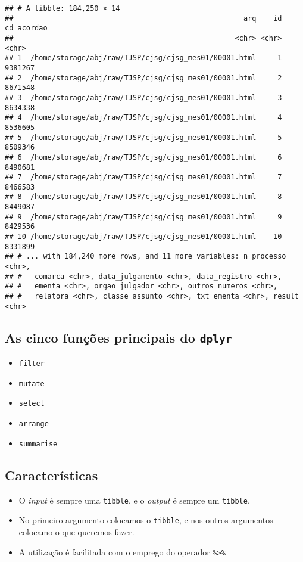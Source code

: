 \documentclass[]{book}
\providecommand{\tightlist}{%
  \setlength{\itemsep}{0pt}\setlength{\parskip}{0pt}}
\begin{document}
\begin{verbatim}
## # A tibble: 184,250 × 14
##                                                      arq    id cd_acordao
##                                                    <chr> <chr>      <chr>
## 1  /home/storage/abj/raw/TJSP/cjsg/cjsg_mes01/00001.html     1    9381267
## 2  /home/storage/abj/raw/TJSP/cjsg/cjsg_mes01/00001.html     2    8671548
## 3  /home/storage/abj/raw/TJSP/cjsg/cjsg_mes01/00001.html     3    8634338
## 4  /home/storage/abj/raw/TJSP/cjsg/cjsg_mes01/00001.html     4    8536605
## 5  /home/storage/abj/raw/TJSP/cjsg/cjsg_mes01/00001.html     5    8509346
## 6  /home/storage/abj/raw/TJSP/cjsg/cjsg_mes01/00001.html     6    8490681
## 7  /home/storage/abj/raw/TJSP/cjsg/cjsg_mes01/00001.html     7    8466583
## 8  /home/storage/abj/raw/TJSP/cjsg/cjsg_mes01/00001.html     8    8449087
## 9  /home/storage/abj/raw/TJSP/cjsg/cjsg_mes01/00001.html     9    8429536
## 10 /home/storage/abj/raw/TJSP/cjsg/cjsg_mes01/00001.html    10    8331899
## # ... with 184,240 more rows, and 11 more variables: n_processo <chr>,
## #   comarca <chr>, data_julgamento <chr>, data_registro <chr>,
## #   ementa <chr>, orgao_julgador <chr>, outros_numeros <chr>,
## #   relatora <chr>, classe_assunto <chr>, txt_ementa <chr>, result <chr>
\end{verbatim}

\subsection{\texorpdfstring{As cinco funções principais do
\texttt{dplyr}}{As cinco funções principais do dplyr}}\label{as-cinco-funcoes-principais-do-dplyr}

\begin{itemize}
\tightlist
\item
  \texttt{filter}
\item
  \texttt{mutate}
\item
  \texttt{select}
\item
  \texttt{arrange}
\item
  \texttt{summarise}
\end{itemize}

\subsection{Características}\label{caracteristicas}

\begin{itemize}
\tightlist
\item
  O \emph{input} é sempre uma \texttt{tibble}, e o \emph{output} é
  sempre um \texttt{tibble}.
\item
  No primeiro argumento colocamos o \texttt{tibble}, e nos outros
  argumentos colocamo o que queremos fazer.
\item
  A utilização é facilitada com o emprego do operador
  \texttt{\%\textgreater{}\%}
\end{itemize}
\end{document}
